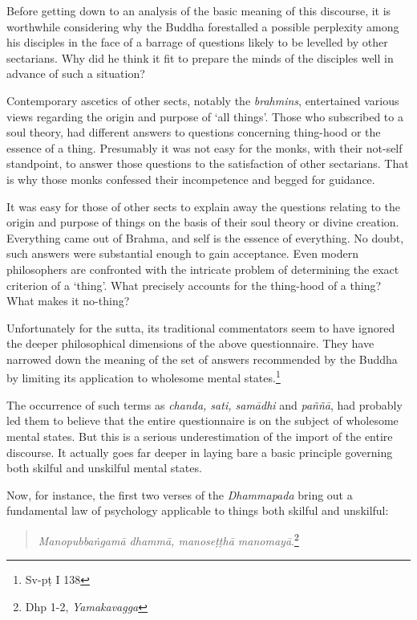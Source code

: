 Before getting down to an analysis of the basic meaning of this discourse, it is worthwhile considering why the Buddha forestalled a possible perplexity among his disciples in the face of a barrage of questions likely to be levelled by other sectarians. Why did he think it fit to prepare the minds of the disciples well in advance of such a situation?

Contemporary ascetics of other sects, notably the \emph{brahmins}, entertained various views regarding the origin and purpose of `all things'. Those who subscribed to a soul theory, had different answers to questions concerning thing-hood or the essence of a thing. Presumably it was not easy for the monks, with their not-self standpoint, to answer those questions to the satisfaction of other sectarians. That is why those monks confessed their incompetence and begged for guidance.

It was easy for those of other sects to explain away the questions relating to the origin and purpose of things on the basis of their soul theory or divine creation. Everything came out of Brahma, and self is the essence of everything. No doubt, such answers were substantial enough to gain acceptance. Even modern philosophers are confronted with the intricate problem of determining the exact criterion of a `thing'. What precisely accounts for the thing-hood of a thing? What makes it no-thing?

Unfortunately for the sutta, its traditional commentators seem to have ignored the deeper philosophical dimensions of the above questionnaire. They have narrowed down the meaning of the set of answers recommended by the Buddha by limiting its application to wholesome mental states.\footnote{Sv-pṭ I 138}

The occurrence of such terms as \emph{chanda, sati, samādhi} and \emph{paññā}, had probably led them to believe that the entire questionnaire is on the subject of wholesome mental states. But this is a serious underestimation of the import of the entire discourse. It actually goes far deeper in laying bare a basic principle governing both skilful and unskilful mental states.

Now, for instance, the first two verses of the \emph{Dhammapada} bring out a fundamental law of psychology applicable to things both skilful and unskilful:

\begin{quote}
\emph{Manopubbaṅgamā dhammā, manoseṭṭhā manomayā}.\footnote{Dhp 1-2, \emph{Yamakavagga}}
\end{quote}

